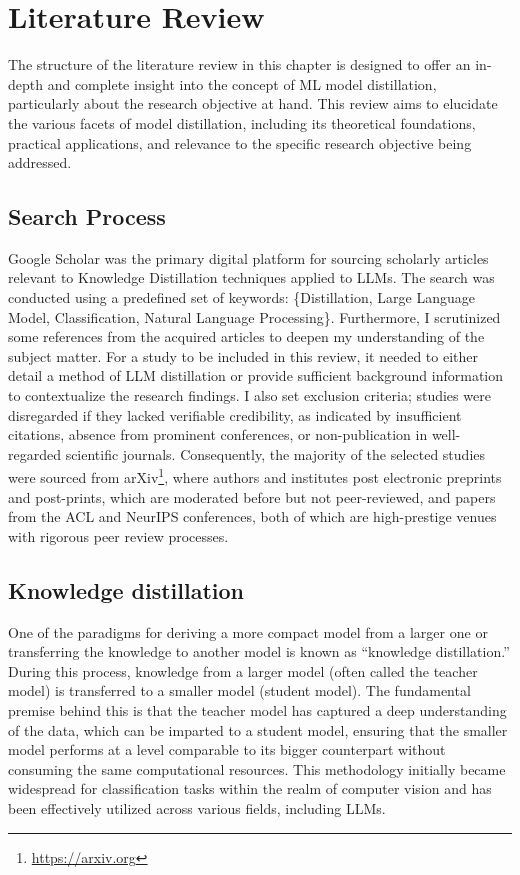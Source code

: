 \chapter{Literature Review}
\label{chap:lr}

The structure of the literature review in this chapter is designed to offer an in-depth and complete insight into the concept of ML model distillation, particularly about the research objective at hand. This review aims to elucidate the various facets of model distillation, including its theoretical foundations, practical applications, and relevance to the specific research objective being addressed.

\section{Search Process}

Google Scholar was the primary digital platform for sourcing scholarly articles relevant to Knowledge Distillation techniques applied to LLMs. The search was conducted using a predefined set of keywords: \{Distillation, Large Language Model, Classification, Natural Language Processing\}. Furthermore, I scrutinized some references from the acquired articles to deepen my understanding of the subject matter. For a study to be included in this review, it needed to either detail a method of LLM distillation or provide sufficient background information to contextualize the research findings. I also set exclusion criteria; studies were disregarded if they lacked verifiable credibility, as indicated by insufficient citations, absence from prominent conferences, or non-publication in well-regarded scientific journals. Consequently, the majority of the selected studies were sourced from arXiv\footnote{\url{https://arxiv.org}}, where authors and institutes post electronic preprints and post-prints, which are moderated before but not peer-reviewed, and papers from the ACL and NeurIPS conferences, both of which are high-prestige venues with rigorous peer review processes.

\section{Knowledge distillation}

One of the paradigms for deriving a more compact model from a larger one or transferring the knowledge to another model is known as ``knowledge distillation.'' During this process, knowledge from a larger model (often called the teacher model) is transferred to a smaller model (student model). The fundamental premise behind this is that the teacher model has captured a deep understanding of the data, which can be imparted to a student model, ensuring that the smaller model performs at a level comparable to its bigger counterpart without consuming the same computational resources. This methodology initially became widespread for classification tasks within the realm of computer vision and has been effectively utilized across various fields, including LLMs.

